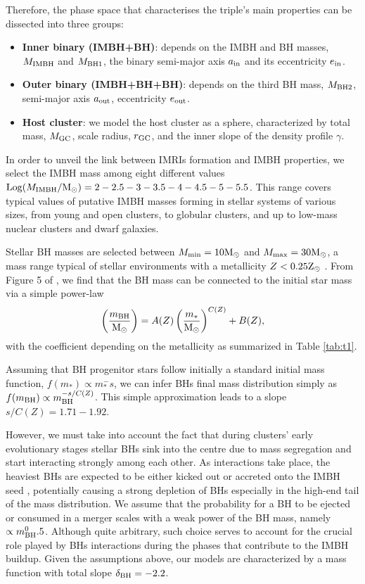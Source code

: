 \documentclass[twocolumn]{aastex62}
\newcommand{\Ms}{{\rm M}_\odot}
\newcommand{\Zs}{{\rm Z}_\odot}
\newcommand{\gc}{{\rm GC}}
\newcommand{\ibh}{{\rm IMBH}}
\newcommand{\inn}{{\rm in}}
\newcommand{\out}{{\rm out}}
\newcommand{\bh}{{\rm BH}}
\newcommand{\bhu}{{\rm BH1}}
\newcommand{\bhd}{{\rm BH2}}
\begin{document}
Therefore, the phase space that characterises the triple's main properties can be dissected into three groups:
\begin{itemize}
    \item {\bf Inner binary (IMBH+BH)}: depends on the IMBH and BH masses, $M_\ibh$ and $M_\bhu$, the binary semi-major axis $a_\inn$ and its eccentricity $e_\inn$.
    \item {\bf Outer binary (IMBH+BH+BH)}: depends on the third BH mass, $M_\bhd$, semi-major axis $a_\out$, eccentricity $e_\out$.
    \item {\bf Host cluster}: we model the host cluster as a \cite{Deh93} sphere, characterized by total mass, $M_\gc$, scale radius, $r_\gc$, and the inner slope of the density profile $\gamma$.
\end{itemize}

In order to unveil the link between IMRIs formation and IMBH properties, we select the IMBH mass among eight different values ${\rm Log}(M_\ibh/\Ms) = 2-2.5-3-3.5-4-4.5-5-5.5$. This range covers typical values of putative IMBH masses forming in stellar systems of various sizes, from young and open clusters, to globular clusters, and up to low-mass nuclear clusters and dwarf galaxies.

Stellar BH masses are selected between $M_{\rm min} = 10\Ms$ and $M_{\rm max} = 30\Ms$, a mass range typical of stellar environments with a metallicity $Z<0.25\Zs$ \citep{belczynski16,spera16}. 
From Figure 5 of \cite{belczynski16}, we find that the BH mass can be connected to the initial star mass via a simple power-law 
\begin{equation}
\left(\frac{m_\bh}{\Ms}\right) = A(Z) \left(\frac{m_*}{\Ms}\right)^{C(Z)} + B(Z),
\end{equation}
with the coefficient depending on the metallicity as summarized in Table \ref{tab:t1}.

Assuming that BH progenitor stars follow initially a standard \cite{kroupa01} initial mass function, $f(m_*) \propto m_*^-s$, we can infer BHs final mass distribution simply as $f(m_\bh)\propto m_\bh^{-s/C(Z)}$. This simple approximation leads to a slope $s/C(Z) = 1.71-1.92$. 

However, we must take into account the fact that during clusters' early evolutionary stages stellar BHs sink into the centre due to mass segregation and start interacting strongly among each other.
As interactions take place, the heaviest BHs are expected to be either kicked out or accreted onto the IMBH seed \citep{giersz15,AAG18a}, potentially causing a strong depletion of BHs especially in the high-end tail of the mass distribution. We assume that the probability for a BH to be ejected or consumed in a merger scales with a weak power of the BH mass, namely $ \propto m_\bh^0.5$. Although quite arbitrary, such choice serves to account for the crucial role played by BHs interactions during the phases that contribute to the IMBH buildup. Given the assumptions above, our models are characterized by a mass function with total slope $\delta_\bh = -2.2$.
\end{document}
